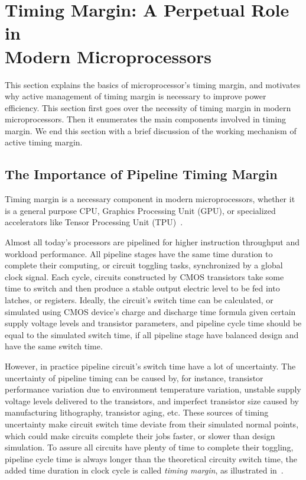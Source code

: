 
\chapter{Timing Margin: A Perpetual Role in \\Modern Microprocessors}
\label{sec:background}

This section explains the basics of microprocessor's timing margin, and motivates why active management of timing margin is necessary to improve power efficiency. This section first goes over the necessity of timing margin in modern microprocessors. Then it enumerates the main components involved in timing margin. We end this section with a brief discussion of the working mechanism of active timing margin.

\section{The Importance of Pipeline Timing Margin}
\label{sec:background:importance}

Timing margin is a necessary component in modern microprocessors, whether it is a general purpose CPU, Graphics Processing Unit (GPU), or specialized accelerators like Tensor Processing Unit (TPU)~\cite{jouppi2017datacenter}.  

Almost all today's processors are pipelined for higher instruction throughput and workload performance. All pipeline stages have the same time duration to complete their computing, or circuit toggling tasks, synchronized by a global clock signal. Each cycle, circuits constructed by CMOS transistors take some time to switch and then produce a stable output electric level to be fed into latches, or registers. Ideally, the circuit's switch time can be calculated, or simulated using CMOS device's charge and discharge time formula given certain supply voltage levels and transistor parameters, and pipeline cycle time should be equal to the simulated switch time, if all pipeline stage have balanced design and have the same switch time. 

However, in practice pipeline circuit's switch time have a lot of uncertainty. The uncertainty of pipeline timing can be caused by, for instance, transistor performance variation due to environment temperature variation, unstable supply voltage levels delivered to the transistors, and imperfect transistor size caused by manufacturing lithography, transistor aging, etc. These sources of timing  uncertainty make circuit switch time deviate from their simulated normal points, which could make circuits complete their jobs faster, or slower than design simulation. To assure all circuits have plenty of time to complete their toggling, pipeline cycle time is always longer than the theoretical circuity switch time, the added time duration in clock cycle is called \textit{timing margin}, as illustrated in~. 

